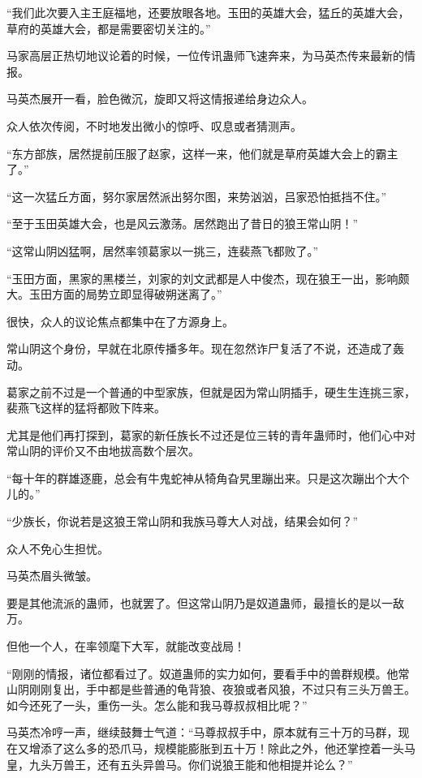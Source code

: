 \begin{this_body}
“我们此次要入主王庭福地，还要放眼各地。玉田的英雄大会，猛丘的英雄大会，草府的英雄大会，都是需要密切关注的。”

马家高层正热切地议论着的时候，一位传讯蛊师飞速奔来，为马英杰传来最新的情报。

马英杰展开一看，脸色微沉，旋即又将这情报递给身边众人。

众人依次传阅，不时地发出微小的惊呼、叹息或者猜测声。

“东方部族，居然提前压服了赵家，这样一来，他们就是草府英雄大会上的霸主了。”

“这一次猛丘方面，努尔家居然派出努尔图，来势汹汹，吕家恐怕抵挡不住。”

“至于玉田英雄大会，也是风云激荡。居然跑出了昔日的狼王常山阴！”

“这常山阴凶猛啊，居然率领葛家以一挑三，连裴燕飞都败了。”

“玉田方面，黑家的黑楼兰，刘家的刘文武都是人中俊杰，现在狼王一出，影响颇大。玉田方面的局势立即显得破朔迷离了。”

很快，众人的议论焦点都集中在了方源身上。

常山阴这个身份，早就在北原传播多年。现在忽然诈尸复活了不说，还造成了轰动。

葛家之前不过是一个普通的中型家族，但就是因为常山阴插手，硬生生连挑三家，裴燕飞这样的猛将都败下阵来。

尤其是他们再打探到，葛家的新任族长不过还是位三转的青年蛊师时，他们心中对常山阴的评价又不由地拔高数个层次。

“每十年的群雄逐鹿，总会有牛鬼蛇神从犄角旮旯里蹦出来。只是这次蹦出个大个儿的。”

“少族长，你说若是这狼王常山阴和我族马尊大人对战，结果会如何？”

众人不免心生担忧。

马英杰眉头微皱。

要是其他流派的蛊师，也就罢了。但这常山阴乃是奴道蛊师，最擅长的是以一敌万。

但他一个人，在率领麾下大军，就能改变战局！

“刚刚的情报，诸位都看过了。奴道蛊师的实力如何，要看手中的兽群规模。他常山阴刚刚复出，手中都是些普通的龟背狼、夜狼或者风狼，不过只有三头万兽王。如今还死了一头，重伤一头。怎么能和我马尊叔叔相比呢？”

马英杰冷哼一声，继续鼓舞士气道：“马尊叔叔手中，原本就有三十万的马群，现在又增添了这么多的恐爪马，规模能膨胀到五十万！除此之外，他还掌控着一头马皇，九头万兽王，还有五头异兽马。你们说狼王能和他相提并论么？”


\end{this_body}
